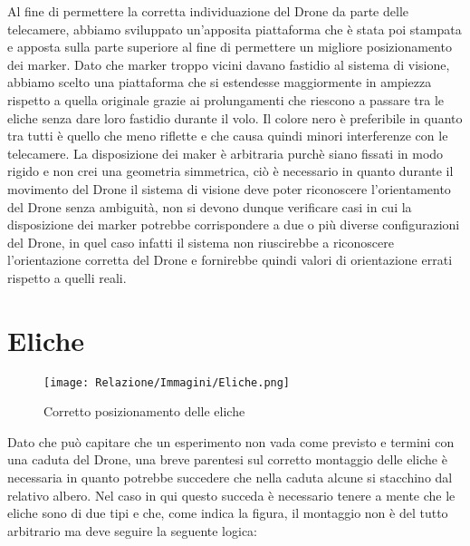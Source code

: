 Al fine di permettere la corretta individuazione del Drone da parte delle telecamere, abbiamo sviluppato un’apposita piattaforma che è stata poi stampata e apposta sulla parte superiore al fine di permettere un migliore posizionamento dei marker. Dato che marker troppo vicini davano fastidio al sistema di visione, abbiamo scelto una piattaforma che si estendesse maggiormente in ampiezza rispetto a quella originale grazie ai prolungamenti che riescono a passare tra le eliche senza dare loro fastidio durante il volo. Il colore nero è preferibile in quanto tra tutti è quello che meno riflette e che causa quindi minori interferenze con le telecamere. La disposizione dei maker è arbitraria purchè siano fissati in modo rigido e non crei una geometria simmetrica, ciò è necessario in quanto durante il movimento del Drone il sistema di visione deve poter riconoscere l’orientamento del Drone senza ambiguità, non si devono dunque verificare casi in cui la disposizione dei marker potrebbe corrispondere a due o più diverse configurazioni del Drone, in quel caso infatti il sistema non riuscirebbe a riconoscere l'orientazione corretta del Drone e fornirebbe quindi valori di orientazione errati rispetto a quelli reali. 

\section*{Eliche}

\begin{figure}[h]
    \centering
    \texttt{[image: Relazione/Immagini/Eliche.png]}	
    \caption{Corretto posizionamento delle eliche}
    \label{fig:Eliche}
\end{figure}

Dato che può capitare che un esperimento non vada come previsto e termini con una caduta del Drone, una breve parentesi sul corretto montaggio delle eliche è necessaria in quanto potrebbe succedere che nella caduta alcune si stacchino dal relativo albero. 
Nel caso in qui questo succeda è necessario tenere a mente che le eliche sono di due tipi e che, come indica la figura, il montaggio non è del tutto arbitrario ma deve seguire la seguente logica: 

